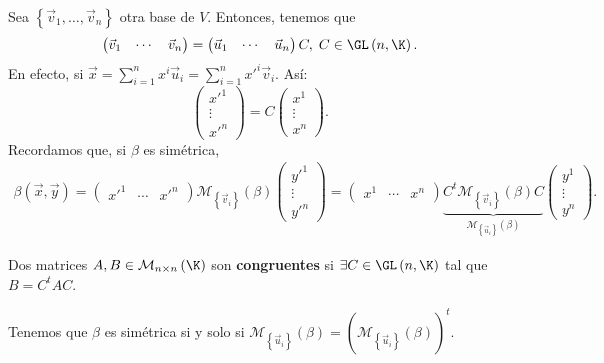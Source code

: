 Sea $\displaystyle \left\{ \vec{v}_{1}, \ldots, \vec{v}_{n}\right\}  $ otra base de $\displaystyle V $. Entonces, tenemos que 
	\[ \begin{pmatrix} \vec{v}_{1} & \cdots & \vec{v}_{n} \end{pmatrix} = \begin{pmatrix} \vec{u}_{1} & \cdots & \vec{u}_{n} \end{pmatrix}C, \; C \in \GL\left(n, \K\right) .\]
En efecto, si $\displaystyle \vec{x} = \sum^{n}_{i = 1}x^{i}\vec{u}_{i} = \sum^{n}_{i = 1}x'^{i}\vec{v}_{i} $. Así:
\[ \begin{pmatrix} x'^{1} \\ \vdots \\ x'^{n} \end{pmatrix} = C \begin{pmatrix} x^{1} \\ \vdots \\ x^{n} \end{pmatrix} .\]
Recordamos que, si $\displaystyle \beta  $ es simétrica, 
	\[
	\begin{split}
			\beta\left(\vec{x}, \vec{y}\right) =  \begin{pmatrix} x'^{1} & \cdots & x'^{n} \end{pmatrix} \mathcal{M}_{ \left\{ \vec{v}_{i}\right\} }\left(\beta \right)\begin{pmatrix} y'^{1} \\ \vdots \\ y'^{n} \end{pmatrix} 
				=   \begin{pmatrix} x^{1} & \cdots & x^{n} \end{pmatrix} \underbrace{C^{t}\mathcal{M}_{ \left\{ \vec{v}_{i}\right\} }\left(\beta \right) C}_{\mathcal{M}_{ \left\{ \vec{u}_{i}\right\} }\left(\beta\right)} \begin{pmatrix}y^{1} \\ \vdots \\ y^{n} \end{pmatrix} .
	\end{split}
	\]
\begin{fdefinition}[]
\normalfont Dos matrices $\displaystyle A,B \in \mathcal{M}_{n \times n}\left(\K\right) $ son \textbf{congruentes} si $\displaystyle \exists C \in \GL\left(n, \K\right) $ tal que $\displaystyle B = C^{t}AC $.
\end{fdefinition}
\begin{observation}
	\normalfont Tenemos que $\displaystyle \beta  $ es simétrica si y solo si $\displaystyle \mathcal{M}_{ \left\{ \vec{u}_{i}\right\} }\left(\beta \right) = \left( \mathcal{M}_{ \left\{ \vec{u}_{i}\right\} }\left(\beta \right)\right)^{t}   $.
\end{observation}

